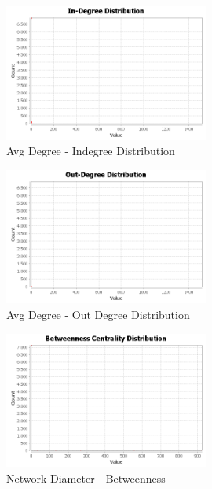 \documentclass[letterpaper,11pt]{report}
\begin{document}
\begin{savenotes}
\begin{figure}[htbp]
	\centering
		\includegraphics[width=0.60\textwidth]{IndegreeDistribution.png}
	\caption{Avg Degree - Indegree Distribution}
	\label{fig:IndegreeDistribution}
\end{figure}


\begin{figure}[htbp]
	\centering
		\includegraphics[width=0.60\textwidth]{OutDegreeDistribution.png}
	\caption{Avg Degree - Out Degree Distribution}
	\label{fig:OutDegreeDistribution}
\end{figure}


\begin{figure}
	\centering
		\includegraphics[width=0.60\textwidth]{BetweennessCentralityDistribution.png}
	\caption{Network Diameter - Betweenness}
	\label{fig:Betweenness Centrality Distribution}
\end{figure}


\end{savenotes}
\end{document}
